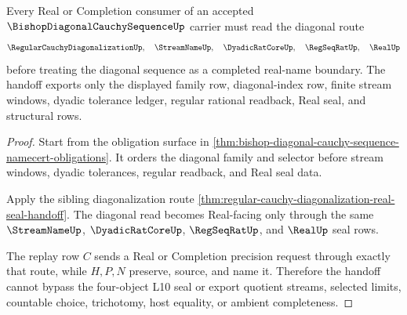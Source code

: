 \begin{theorem}
\label{thm:bishop-diagonal-cauchy-sequence-real-handoff}
Every Real or Completion consumer of an accepted $\BishopDiagonalCauchySequenceUp$ carrier must read the diagonal route
$$
\RegularCauchyDiagonalizationUp,\quad
\StreamNameUp,\quad
\DyadicRatCoreUp,\quad
\RegSeqRatUp,\quad
\RealUp
$$
before treating the diagonal sequence as a completed real-name boundary. The handoff exports only the displayed family row, diagonal-index row, finite stream windows, dyadic tolerance ledger, regular rational readback, Real seal, and structural rows.
\end{theorem}
\begin{proof}
Start from the obligation surface in \autoref{thm:bishop-diagonal-cauchy-sequence-namecert-obligations}. It orders the diagonal family and selector before stream windows, dyadic tolerances, regular readback, and Real seal data.

Apply the sibling diagonalization route \autoref{thm:regular-cauchy-diagonalization-real-seal-handoff}. The diagonal read becomes Real-facing only through the same $\StreamNameUp$, $\DyadicRatCoreUp$, $\RegSeqRatUp$, and $\RealUp$ seal rows.

The replay row $C$ sends a Real or Completion precision request through exactly that route, while $H,P,N$ preserve, source, and name it. Therefore the handoff cannot bypass the four-object L10 seal or export quotient streams, selected limits, countable choice, trichotomy, host equality, or ambient completeness.
\end{proof}




